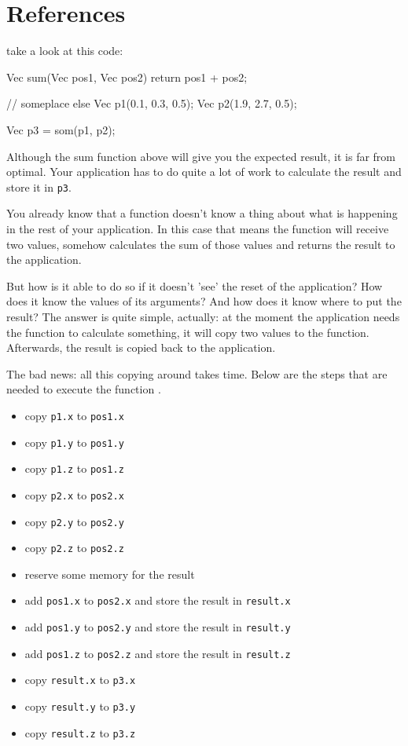 \chapter{References}
\label{chapter:references}

take a look at this code:

\begin{code}
Vec sum(Vec pos1, Vec pos2) {
  return pos1 + pos2;
}

// someplace else
Vec p1(0.1, 0.3, 0.5);
Vec p2(1.9, 2.7, 0.5);

Vec p3 = som(p1, p2); 
\end{code}

Although the sum function above will give you the expected result, it is far from optimal. Your application has to do quite a lot of work to calculate the result and store it in \texttt{p3}.

You already know that a function doesn't know a thing about what is happening in the rest of your application. In this case that means the function will receive two values, somehow calculates the sum of those values and returns the result to the application.

But how is it able to do so if it doesn't 'see' the reset of the application? How does it know the values of its arguments? And how does it know where to put the result? The answer is quite simple, actually: at the moment the application needs the function  to calculate something, it will copy two values to the function. Afterwards, the result is copied back to the application.

The bad news: all this copying around takes time. Below are the steps that are needed to execute the function .


\begin{itemize}
\item copy \texttt{p1.x} to \texttt{pos1.x}
\item copy \texttt{p1.y} to \texttt{pos1.y}
\item copy \texttt{p1.z} to \texttt{pos1.z}
\item copy \texttt{p2.x} to \texttt{pos2.x}
\item copy \texttt{p2.y} to \texttt{pos2.y}
\item copy \texttt{p2.z} to \texttt{pos2.z}
\item reserve some memory for the result
\item add \texttt{pos1.x} to \texttt{pos2.x} and store the result in \texttt{result.x}
\item add \texttt{pos1.y} to \texttt{pos2.y} and store the result in \texttt{result.y}
\item add \texttt{pos1.z} to \texttt{pos2.z} and store the result in \texttt{result.z}
\item copy \texttt{result.x} to \texttt{p3.x}
\item copy \texttt{result.y} to \texttt{p3.y}
\item copy \texttt{result.z} to \texttt{p3.z}
\end{itemize}

